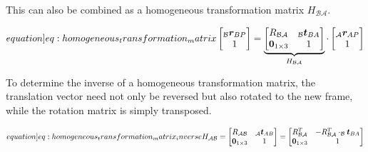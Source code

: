 
This can also be combined as a homogeneous transformation matrix $H_{\mathcal B \mathcal A}$.

\begin{equation}
    \label[equation]{eq:homogeneous_transformation_matrix}
    \begin{bmatrix} _\mathcal B \vec r_{BP} \\ 1 \end{bmatrix} = \underbrace{\begin{bmatrix} R_{\mathcal B \mathcal A} & _\mathcal B \vec t_{BA} \\ \vec 0_{1\times 3} & 1 \end{bmatrix}}_{H_{\mathcal B \mathcal A}} \cdot \begin{bmatrix} _\mathcal A \vec r_{AP} \\ 1 \end{bmatrix}
\end{equation}


To determine the inverse of a homogeneous transformation matrix, the translation vector need not only be reversed but also rotated to the new frame, while the rotation matrix is simply transposed.

\begin{equation}
    \label[equation]{eq:homogeneous_transformation_matrix_inverse}
    H_{\mathcal A \mathcal B} = \begin{bmatrix} R_{\mathcal A \mathcal B} & _\mathcal A \vec t_{AB} \\ \vec 0_{1\times 3} & 1 \end{bmatrix}
    = \begin{bmatrix} R_{\mathcal B \mathcal A}^T & -R_{\mathcal B \mathcal A}^T \cdot _\mathcal B \vec t_{BA} \\ \vec 0_{1\times 3} & 1 \end{bmatrix} 
\end{equation}

